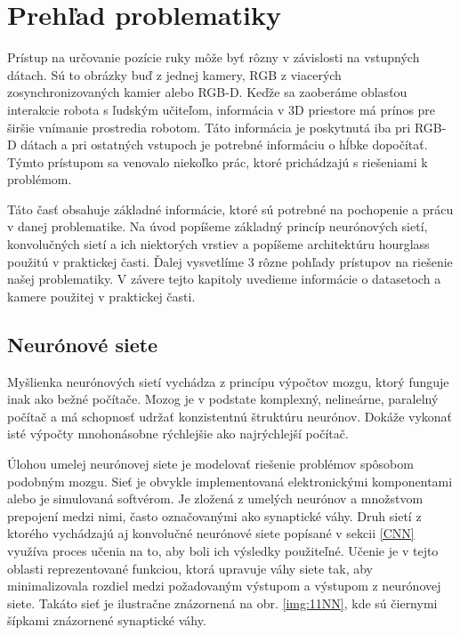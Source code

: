  \chapter{Prehľad problematiky}\label{chap:issues_overview}

Prístup na určovanie pozície ruky môže byť rôzny v závislosti na vstupných dátach. Sú to obrázky buď z jednej kamery, RGB z viacerých zosynchronizovaných kamier alebo RGB-D. Keďže sa zaoberáme oblasťou interakcie robota s ľudským učiteľom, informácia v 3D priestore má prínos pre širšie vnímanie prostredia robotom. Táto informácia je poskytnutá iba pri RGB-D dátach a pri ostatných vstupoch je potrebné informáciu o hĺbke dopočítať. Týmto prístupom sa venovalo niekoľko prác, ktoré prichádzajú s riešeniami k problémom.

Táto časť obsahuje základné informácie, ktoré sú potrebné na pochopenie a prácu v danej problematike. Na úvod popíšeme základný princíp neurónových sietí, konvolučných sietí a ich niektorých vrstiev a popíšeme architektúru hourglass použitú v praktickej časti. Ďalej vysvetlíme 3 rôzne pohľady prístupov na riešenie našej problematiky. V závere tejto kapitoly uvedieme informácie o datasetoch a kamere použitej v praktickej časti.

\section{Neurónové siete}\label{chpt:neuralNetwork}
Myšlienka neurónových sietí vychádza z princípu výpočtov mozgu, ktorý funguje inak ako bežné počítače. Mozog je v podstate komplexný, nelineárne, paralelný počítač a má schopnosť udržať konzistentnú štruktúru neurónov. Dokáže vykonať isté výpočty mnohonásobne rýchlejšie ako najrýchlejší počítač.

Úlohou umelej neurónovej siete je modelovať riešenie problémov spôsobom podobným mozgu. Sieť je obvykle implementovaná elektronickými komponentami alebo je simulovaná softvérom. Je zložená z umelých neurónov a množstvom prepojení medzi nimi, často označovanými ako synaptické váhy. Druh sietí z ktorého vychádzajú aj konvolučné neurónové siete popísané v sekcii \ref{CNN} využíva proces učenia na to, aby boli ich výsledky použiteľné. Učenie je v tejto oblasti reprezentované funkciou, ktorá upravuje váhy siete tak, aby minimalizovala rozdiel medzi požadovaným výstupom a výstupom z neurónovej siete. Takáto sieť je ilustračne znázornená na obr. \ref{img:11NN}, kde sú čiernymi šípkami znázornené synaptické váhy.

